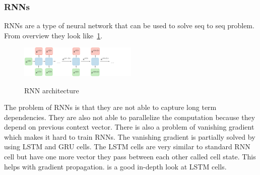 \documentclass{article}
\begin{document}
    \subsubsection{RNNs}
    RNNs are a type of neural network that can be used to solve seq to seq problem.
    From overview they look like~\ref{fig:rnn}.
    \begin{figure}[h!]
        \centering
        \includegraphics[width=0.5\textwidth]{architecture-rnn-ltr.png}\cite{CS230Recurrent}\label{fig:rnn}
        \caption{RNN architecture}
    \end{figure}
    The problem of RNNs is that they are not able to capture long term dependencies.
    They are also not able to parallelize the computation because they depend on previous context vector.
    There is also a problem of vanishing gradient which makes it hard to train RNNs.
    The vanishing gradient is partially solved by using LSTM and GRU cells.
    The LSTM cells are very similar to standard RNN cell but have one more vector they pass between each other called cell state.
    This helps with gradient propagation.\cite{staudemeyerUnderstandingLSTMTutorial2019} is a good in-depth look at LSTM cells.

    
\end{document}
